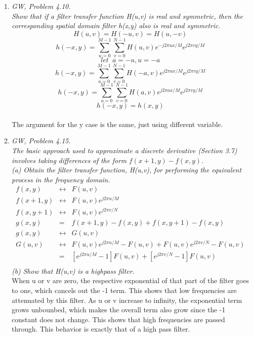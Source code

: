 \documentclass{article}
\begin{document}
\begin{enumerate}
    \pagebreak
    \item \textit{GW, Problem 4.10.\\
    Show that if a filter transfer function H(u,v) is real and symmetric, then
    the corresponding spatial domain filter h(x,y) also is real and symmetric.}\\
    $$ H(u,v) = H(-u,v) = H(u,-v) $$
    $$ h(-x,y) = \sum_{u=0}^{M-1}\sum_{v=0}^{N-1} H(u,v) e^{-j2\pi ux/M}
                                                         e^{j2\pi vy/M} $$
    $$ let \;\; a = -u, u = -a $$
    $$ h(-x,y) = \sum_{a=0}^{M-1}\sum_{v=0}^{N-1} H(-a,v) e^{j2\pi ax/M}
                                                          e^{j2\pi vy/M} $$
    $$ h(-x,y) = \sum_{a=0}^{M-1}\sum_{v=0}^{N-1} H(a,v) e^{j2\pi ax/M}
                                                         e^{j2\pi vy/M} $$
    $$ h(-x,y) = h(x,y) $$\\
    The argument for the y case is the same, just using different variable.\\

    \item \textit{GW, Problem 4.15.\\
    The basic approach used to approximate a discrete derivative (Section 3.7)
    involves taking differences of the form $ f(x+1,y)-f(x,y) $.\\
      (a) Obtain the filter transfer function, H(u,v), for performing the
          equivalent process in the frequency domain.}\\
    \begin{eqnarray*}
      f(x,y) &\longleftrightarrow & F(u,v)\\
      f(x+1,y) &\longleftrightarrow & F(u,v)e^{j2\pi u/M}\\
      f(x,y+1) &\longleftrightarrow & F(u,v)e^{j2\pi v/N}\\
      g(x,y) &=& f(x+1,y) - f(x,y) + f(x,y+1) - f(x,y)\\
      g(x,y) &\longleftrightarrow & G(u,v)\\
      G(u,v) &\longleftrightarrow & F(u,v)e^{j2\pi u/M}-F(u,v) +
                                    F(u,v)e^{j2\pi v/N}-F(u,v)\\
             &=& \left[e^{j2\pi u/M}-1\right]F(u,v) +
                 \left[e^{j2\pi v/N}-1\right]F(u,v)\\
    \end{eqnarray*}
      \textit{(b) Show that H(u,v) is a highpass filter.}\\
      \linebreak
      When u or v are zero, the respective exponential of that part of the
      filter goes to one, which cancels out the -1 term. This shows that low
      frequencies are attenuated by this filter. As u or v increase to
      infinity, the exponential term grows unbounbed, which makes the overall
      term also grow since the -1 constant does not change. This shows that
      high frequencies are passed through. This behavior is exactly that of
      a high pass filter.\\


\end{enumerate}
\end{document}
